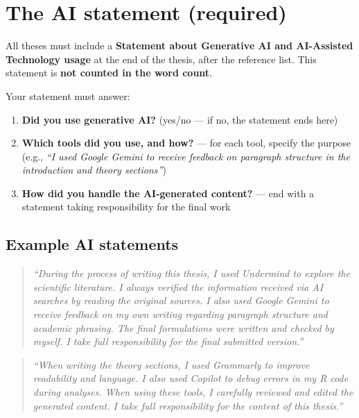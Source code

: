 \documentclass[
  11pt,
  a4paper,
]{scrbook}
\providecommand{\tightlist}{%
  \setlength{\itemsep}{0pt}\setlength{\parskip}{0pt}}\usepackage{longtable,booktabs,array}
\begin{document}
\section{The AI statement (required)}\label{the-ai-statement-required}

All theses must include a \textbf{Statement about Generative AI and
AI-Assisted Technology usage} at the end of the thesis, after the
reference list. This statement is \textbf{not counted in the word
count}.

Your statement must answer:

\begin{enumerate}
\def\labelenumi{\arabic{enumi}.}
\tightlist
\item
  \textbf{Did you use generative AI?} (yes/no --- if no, the statement
  ends here)
\item
  \textbf{Which tools did you use, and how?} --- for each tool, specify
  the purpose (e.g., \emph{``I used Google Gemini to receive feedback on
  paragraph structure in the introduction and theory sections''})
\item
  \textbf{How did you handle the AI-generated content?} --- end with a
  statement taking responsibility for the final work
\end{enumerate}

\subsection{Example AI statements}\label{example-ai-statements}

\begin{quote}
\emph{``During the process of writing this thesis, I used Undermind to
explore the scientific literature. I always verified the information
received via AI searches by reading the original sources. I also used
Google Gemini to receive feedback on my own writing regarding paragraph
structure and academic phrasing. The final formulations were written and
checked by myself. I take full responsibility for the final submitted
version.''}
\end{quote}

\begin{quote}
\emph{``When writing the theory sections, I used Grammarly to improve
readability and language. I also used Copilot to debug errors in my R
code during analyses. When using these tools, I carefully reviewed and
edited the generated content. I take full responsibility for the content
of this thesis.''}
\end{quote}
\end{document}

